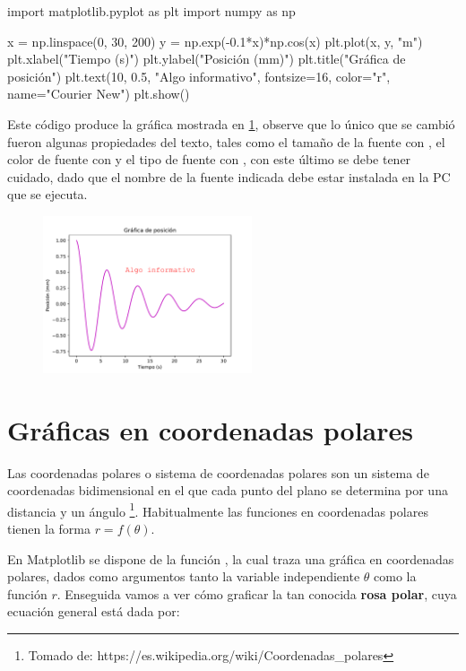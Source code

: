 \begin{python}
import matplotlib.pyplot as plt
import numpy as np

x = np.linspace(0, 30, 200)
y = np.exp(-0.1*x)*np.cos(x)
plt.plot(x, y, "m")
plt.xlabel("Tiempo (s)")
plt.ylabel("Posición (mm)")
plt.title("Gráfica de posición")
plt.text(10, 0.5, "Algo informativo", fontsize=16, color="r", 
         name="Courier New")
plt.show()
\end{python}

Este código produce la gráfica mostrada en \ref{fig:plot_text_2}, observe que lo único que se cambió fueron algunas 
propiedades del texto, tales como el tamaño de la fuente con , el color de fuente con  
y el tipo de fuente con , con este último se debe tener cuidado, dado que el nombre de la fuente indicada 
debe estar instalada en la PC que se ejecuta. 

\begin{figure}[H]
	\centering
	\includegraphics[width=0.55\textwidth]{img/ch03/plot_text_2.pdf}
	\caption{}
	\label{fig:plot_text_2}
\end{figure}


\section{Gráficas en coordenadas polares}

Las coordenadas polares o sistema de coordenadas polares son un sistema de coordenadas bidimensional en el que cada punto del plano se determina por una distancia y un ángulo \footnote{Tomado de: https://es.wikipedia.org/wiki/Coordenadas\_polares}. Habitualmente 
las funciones en coordenadas polares tienen la forma $ r = f(\theta)$.

En Matplotlib se dispone de la función , la cual traza una gráfica en coordenadas polares, dados como argumentos 
tanto la variable independiente $\theta$ como la función $r$. Enseguida vamos a ver cómo graficar la tan conocida 
\textbf{rosa polar}, cuya ecuación general está dada por:

